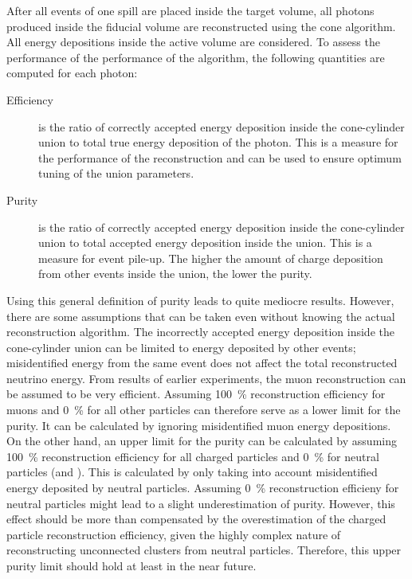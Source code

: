 After all events of one spill are placed inside the target volume, all \Pgpz photons produced inside the fiducial volume are reconstructed using the cone algorithm.
All energy depositions inside the active volume are considered.
To assess the performance of the performance of the algorithm, the following quantities are computed for each photon:
\begin{description}
	\item[Efficiency] is the ratio of correctly accepted energy deposition inside the cone-cylinder union to total true energy deposition of the photon.
		This is a measure for the performance of the reconstruction and can be used to ensure optimum tuning of the union parameters.
	\item[Purity] is the ratio of correctly accepted energy deposition inside the cone-cylinder union to total accepted energy deposition inside the union.
		This is a measure for event pile-up.
		The higher the amount of charge deposition from other events inside the union, the lower the purity.
\end{description}
Using this general definition of purity leads to quite mediocre results.
However, there are some assumptions that can be taken even without knowing the actual reconstruction algorithm.
The incorrectly accepted energy deposition inside the cone-cylinder union can be limited to energy deposited by other events; misidentified energy from the same event does not affect the total reconstructed neutrino energy.
From results of earlier experiments, the muon reconstruction can be assumed to be very efficient.
Assuming \SI{100}{\percent} reconstruction efficiency for muons and \SI{0}{\percent} for all other particles can therefore serve as a lower limit for the purity.
It can be calculated by ignoring misidentified muon energy depositions.
On the other hand, an upper limit for the purity can be calculated by assuming \SI{100}{\percent} reconstruction efficiency for all charged particles and \SI{0}{\percent} for neutral particles (\Pgpz and \Pgg).
This is calculated by only taking into account misidentified energy deposited by neutral particles.
Assuming \SI{0}{\percent} reconstruction efficieny for neutral particles might lead to a slight underestimation of purity.
However, this effect should be more than compensated by the overestimation of the charged particle reconstruction efficiency, given the highly complex nature of reconstructing unconnected clusters from neutral particles.
Therefore, this upper purity limit should hold at least in the near future.

